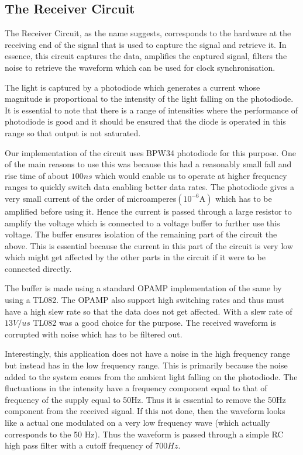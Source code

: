 \documentclass{article}
\begin{document}
\subsection{The Receiver Circuit}
The Receiver Circuit, as the name suggests, corresponds to the hardware at the receiving end of the signal that is used to capture the signal and retrieve it. In essence, this circuit captures the data, amplifies the captured signal, filters the noise to retrieve the waveform which can be used for clock synchronisation.

The light is captured by a photodiode which generates a current whose magnitude is proportional to the intensity of the light falling on the photodiode. It is essential to note that there is a range of intensities where the performance of photodiode is good and it should be ensured that the diode is operated in this range so that output is not saturated.

Our implementation of the circuit uses BPW34 photodiode for this purpose. One of the main reasons to use this was because this had a reasonably small fall and rise time of about $100ns$ which would enable us to operate at higher frequency ranges to quickly switch data enabling better data rates. The photodiode gives a very small current of the order of microamperes$(10^{-6}\text{A})$ which has to be amplified before using it. Hence the current is passed through a large resistor to amplify the voltage which is connected to a voltage buffer to further use this voltage. The buffer ensures isolation of the remaining part of the circuit the above. This is essential because the current in this part of the circuit is very low which might get affected by the other parts in the circuit if it were to be connected directly.

The buffer is made using a standard OPAMP implementation of the same by using a TL082. The OPAMP also support high switching rates and thus must have a high slew rate so that the data does not get affected. With a slew rate of $13V/us$ TL082 was a good choice for the purpose. The received waveform is corrupted with noise which has to be filtered out.

Interestingly, this application does not have a noise in the high frequency range but instead has in the low frequency range. This is primarily because the noise added to the system comes from the ambient light falling on the photodiode. The fluctuations in the intensity have a frequency component equal to that of frequency of the supply equal to 50Hz. Thus it is essential to remove the 50Hz component from the received signal. If this not done, then the waveform looks like a actual one modulated on a very low frequency wave (which actually corresponds to the 50 Hz).  Thus the waveform is passed through a simple RC high pass filter with a cutoff frequency of $700 Hz$.
\end{document}
